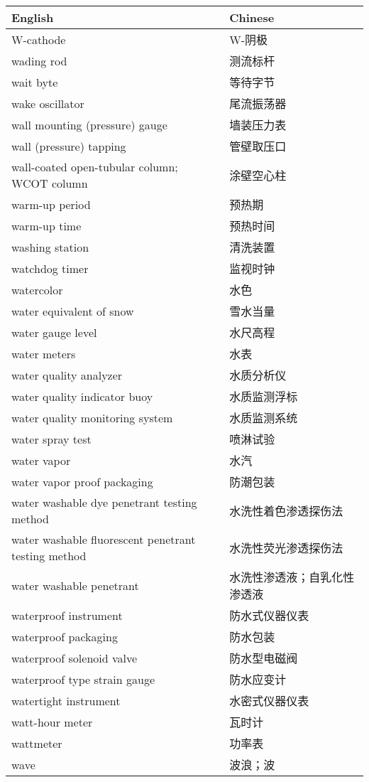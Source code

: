 \documentclass[
]{article}
\begin{document}
\begin{longtable}[]{@{}ll@{}}
\toprule()
English & Chinese \\
\midrule()
\endhead
W-cathode & W-阴极 \\
wading rod & 测流标杆 \\
wait byte & 等待字节 \\
wake oscillator & 尾流振荡器 \\
wall mounting (pressure) gauge & 墙装压力表 \\
wall (pressure) tapping & 管壁取压口 \\
wall-coated open-tubular column; WCOT column & 涂壁空心柱 \\
warm-up period & 预热期 \\
warm-up time & 预热时间 \\
washing station & 清洗装置 \\
watchdog timer & 监视时钟 \\
watercolor & 水色 \\
water equivalent of snow & 雪水当量 \\
water gauge level & 水尺高程 \\
water meters & 水表 \\
water quality analyzer & 水质分析仪 \\
water quality indicator buoy & 水质监测浮标 \\
water quality monitoring system & 水质监测系统 \\
water spray test & 喷淋试验 \\
water vapor & 水汽 \\
water vapor proof packaging & 防潮包装 \\
water washable dye penetrant testing method & 水洗性着色渗透探伤法 \\
water washable fluorescent penetrant testing method &
水洗性荧光渗透探伤法 \\
water washable penetrant & 水洗性渗透液；自乳化性渗透液 \\
waterproof instrument & 防水式仪器仪表 \\
waterproof packaging & 防水包装 \\
waterproof solenoid valve & 防水型电磁阀 \\
waterproof type strain gauge & 防水应变计 \\
watertight instrument & 水密式仪器仪表 \\
watt-hour meter & 瓦时计 \\
wattmeter & 功率表 \\
wave & 波浪；波 \\

\end{longtable}
\end{document}
